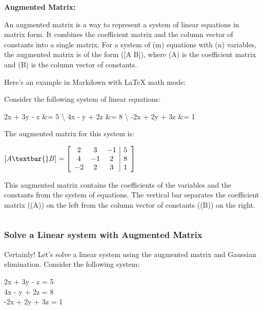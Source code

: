 \documentclass[11pt]{article}
\makeatletter
\newcommand{\boxspacing}{\kern\kvtcb@left@rule\kern\kvtcb@boxsep}
\newcommand{\prompt}[4]{
        {\ttfamily\llap{{\color{#2}[#3]:\hspace{3pt}#4}}\vspace{-\baselineskip}}
    }
\makeatother
\begin{document}
    \textbf{Augmented Matrix:}

An augmented matrix is a way to represent a system of linear equations
in matrix form. It combines the coefficient matrix and the column vector
of constants into a single matrix. For a system of (m) equations with
(n) variables, the augmented matrix is of the form ({[}A \textbar{}
B{]}), where (A) is the coefficient matrix and (B) is the column vector
of constants.

Here's an example in Markdown with LaTeX math mode:

Consider the following system of linear equations:

2x + 3y - z \&= 5 \textbackslash{} 4x - y + 2z \&= 8 \textbackslash{}
-2x + 2y + 3z \&= 1

The augmented matrix for this system is:

$  {[}A \textbar{} B{]} = \left[ \begin{array}{ccc|c}
2 & 3 & -1 & 5 \\
4 & -1 & 2 & 8 \\
-2 & 2 & 3 & 1
\end{array} \right]$ 

This augmented matrix contains the coefficients of the variables and the
constants from the system of equations. The vertical bar separates the
coefficient matrix ((A)) on the left from the column vector of constants
((B)) on the right.

    \begin{tcolorbox}[breakable, size=fbox, boxrule=1pt, pad at break*=1mm,colback=cellbackground, colframe=cellborder]
\prompt{In}{incolor}{ }{\boxspacing}
\begin{Verbatim}[commandchars=\\\{\}]

\end{Verbatim}
\end{tcolorbox}

    \hypertarget{solve-a-linear-system-with-augmented-matrix}{%
\subsubsection{Solve a Linear system with Augmented
Matrix}\label{solve-a-linear-system-with-augmented-matrix}}

    Certainly! Let's solve a linear system using the augmented matrix and
Gaussian elimination. Consider the following system:


2x + 3y - z = 5 \\
4x - y + 2z = 8 \\
-2x + 2y + 3z = 1
\end{document}
